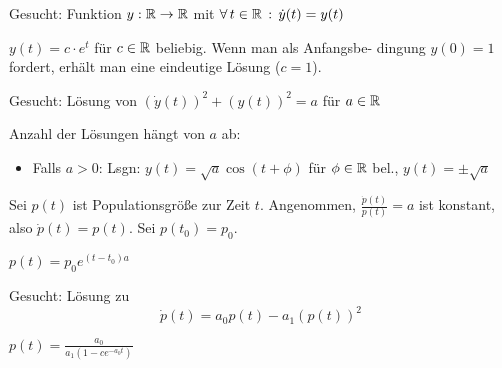 \documentclass{cheat-sheet}
\begin{document}



\begin{bsp}
  Gesucht: Funktion $y : \mathbb{R} \to \mathbb{R}$ mit $\forall \, {t \in \mathbb{R}} \,:\, \dot{y}(t) = y(t)$\\
\end{bsp}

\begin{lsg}
  $y(t) = c \cdot e^t$ für $c \in \mathbb{R}$ beliebig. Wenn man als Anfangsbe- dingung $y(0) = 1$ fordert, erhält man eine eindeutige Lösung ($c = 1$).
\end{lsg}

\begin{bsp}
  Gesucht: Lösung von $\left(\dot{y}(t)\right)^2 + \left(y(t)\right)^2 = a$ für $a \in \mathbb{R}$\\
\end{bsp}

\begin{lsg}
  Anzahl der Lösungen hängt von $a$ ab:
  \begin{itemize}
    \item Falls $a > 0$: Lsgn: $y(t) = \sqrt{a} \cos(t + \phi)$ für $\phi \in \mathbb{R}$ bel., $y(t) = \pm \sqrt{a}$
  \end{itemize}
\end{lsg}

\begin{bsp}
  Sei $p(t)$ ist Populationsgröße zur Zeit $t$.
  Angenommen, $\tfrac{\dot{p}(t)}{p(t)} = a$ ist konstant, also $\dot{p}(t) = p(t)$. Sei $p(t_0) = p_0$.
\end{bsp}

\begin{lsg}
  $p(t) = p_0 e^{(t-t_0) a}$
\end{lsg}

\begin{bsp}
  Gesucht: Lösung zu
  \[ \dot{p}(t) = a_0 p(t) - a_1 \left(p(t)\right)^2 \]
\end{bsp}

\begin{lsg}
  $p(t) = \frac{a_0}{a_1 (1 - c e^{-a_0 t})}$
\end{lsg}
\end{document}
